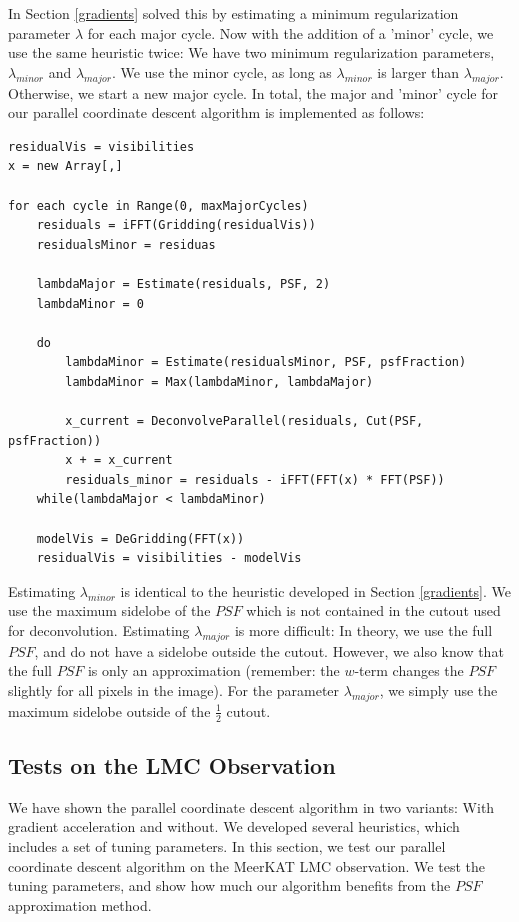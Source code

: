 In Section \ref{gradients} solved this by estimating a minimum regularization parameter $\lambda$ for each major cycle. Now with the addition of a 'minor' cycle, we use the same heuristic twice: We have two minimum regularization parameters, $\lambda_{minor}$ and $\lambda_{major}$. We use the minor cycle, as long as  $\lambda_{minor}$ is larger than  $\lambda_{major}$. Otherwise, we start a new major cycle. In total, the major and 'minor' cycle for our parallel coordinate descent algorithm is implemented as follows:

\begin{lstlisting}
residualVis = visibilities
x = new Array[,]

for each cycle in Range(0, maxMajorCycles)
	residuals = iFFT(Gridding(residualVis))
	residualsMinor = residuas
	
	lambdaMajor = Estimate(residuals, PSF, 2)
	lambdaMinor = 0
	
	do
		lambdaMinor = Estimate(residualsMinor, PSF, psfFraction)
		lambdaMinor = Max(lambdaMinor, lambdaMajor)
		
		x_current = DeconvolveParallel(residuals, Cut(PSF, psfFraction))
		x + = x_current
		residuals_minor = residuals - iFFT(FFT(x) * FFT(PSF))
	while(lambdaMajor < lambdaMinor)
	
	modelVis = DeGridding(FFT(x))
	residualVis = visibilities - modelVis
\end{lstlisting}

Estimating $\lambda_{minor}$ is identical to the heuristic developed in Section \ref{gradients}. We use the maximum sidelobe of the $PSF$ which is not contained in the cutout used for deconvolution. Estimating $\lambda_{major}$ is more difficult: In theory, we use the full $PSF$, and do not have a sidelobe outside the cutout. However, we also know that the full $PSF$ is only an approximation (remember: the $w$-term changes the $PSF$ slightly for all pixels in the image). For the parameter $\lambda_{major}$, we simply use the maximum sidelobe outside of the $\frac{1}{2}$ cutout.


\subsection{Tests on the LMC Observation}\label{pcdm:results}
We have shown the parallel coordinate descent algorithm in two variants: With gradient acceleration and without. We developed several heuristics, which includes a set of tuning parameters. In this section, we test our parallel coordinate descent algorithm on the MeerKAT LMC observation. We test the tuning parameters, and show how much our algorithm benefits from the $PSF$ approximation method.

